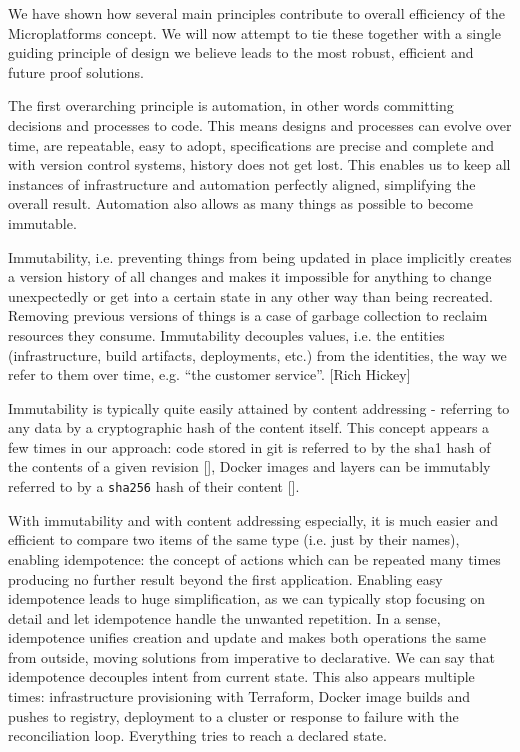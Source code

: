 \documentclass[reprint,amsmath,amssymb,aps]{revtex4-1}
\begin{document}
We have shown how several main principles contribute to overall efficiency of the Microplatforms concept. We will now attempt to tie these together with a single guiding principle of design we believe leads to the most robust, efficient and future proof solutions.

The first overarching principle is automation, in other words committing decisions and processes to code. This means designs and processes can evolve over time, are repeatable, easy to adopt, specifications are precise and complete and with version control systems, history does not get lost. This enables us to keep all instances of infrastructure and automation perfectly aligned, simplifying the overall result. Automation also allows as many things as possible to become immutable.

Immutability, i.e. preventing things from being updated in place implicitly creates a version history of all changes and makes it impossible for anything to change unexpectedly or get into a certain state in any other way than being recreated. Removing previous versions of things is a case of garbage collection to reclaim resources they consume. Immutability decouples values, i.e. the entities (infrastructure, build artifacts, deployments, etc.) from the identities, the way we refer to them over time, e.g. “the customer service”. [Rich Hickey]

Immutability is typically quite easily attained by content addressing - referring to any data by a cryptographic hash of the content itself. This concept appears a few times in our approach: code stored in git is referred to by the sha1 hash of the contents of a given revision [], Docker images and layers can be immutably referred to by a \texttt{sha256} hash of their content [].

With immutability and with content addressing especially, it is much easier and efficient to compare two items of the same type (i.e. just by their names), enabling idempotence: the concept of actions which can be repeated many times producing no further result beyond the first application. Enabling easy idempotence leads to huge simplification, as we can typically stop focusing on detail and let idempotence handle the unwanted repetition. In a sense, idempotence unifies creation and update and makes both operations the same from outside, moving solutions from imperative to declarative. We can say that idempotence decouples intent from current state. This also appears multiple times: infrastructure provisioning with Terraform, Docker image builds and pushes to registry, deployment to a cluster or response to failure with the reconciliation loop. Everything tries to reach a declared state.
\end{document}
